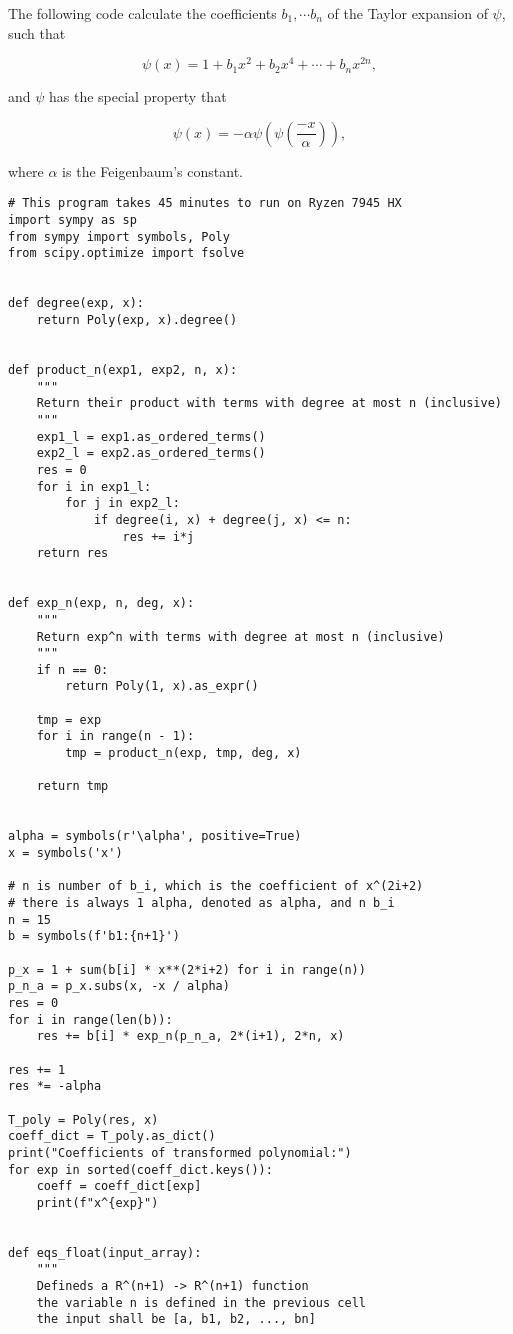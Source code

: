 The following code calculate the coefficients $b_1, \cdots b_n$ of the Taylor expansion of $\psi$, such that

$$
\psi(x) = 1 + b_1 x^2 + b_2 x^4 + \cdots + b_n x^{2n},
$$

and $\psi$ has the special property that 

$$
\psi(x) = - \alpha \psi(\psi(\frac{-x}{\alpha})),
$$

where $\alpha$ is the Feigenbaum's constant.

\begin{lstlisting}[style=python]
# This program takes 45 minutes to run on Ryzen 7945 HX
import sympy as sp
from sympy import symbols, Poly
from scipy.optimize import fsolve


def degree(exp, x):
    return Poly(exp, x).degree()


def product_n(exp1, exp2, n, x):
    """
    Return their product with terms with degree at most n (inclusive)
    """
    exp1_l = exp1.as_ordered_terms()
    exp2_l = exp2.as_ordered_terms()
    res = 0
    for i in exp1_l:
        for j in exp2_l:
            if degree(i, x) + degree(j, x) <= n:
                res += i*j
    return res


def exp_n(exp, n, deg, x):
    """
    Return exp^n with terms with degree at most n (inclusive)
    """
    if n == 0:
        return Poly(1, x).as_expr()

    tmp = exp
    for i in range(n - 1):
        tmp = product_n(exp, tmp, deg, x)

    return tmp


alpha = symbols(r'\alpha', positive=True)
x = symbols('x')

# n is number of b_i, which is the coefficient of x^(2i+2)
# there is always 1 alpha, denoted as alpha, and n b_i
n = 15
b = symbols(f'b1:{n+1}')

p_x = 1 + sum(b[i] * x**(2*i+2) for i in range(n))
p_n_a = p_x.subs(x, -x / alpha)
res = 0
for i in range(len(b)):
    res += b[i] * exp_n(p_n_a, 2*(i+1), 2*n, x)

res += 1
res *= -alpha

T_poly = Poly(res, x)
coeff_dict = T_poly.as_dict()
print("Coefficients of transformed polynomial:")
for exp in sorted(coeff_dict.keys()):
    coeff = coeff_dict[exp]
    print(f"x^{exp}")


def eqs_float(input_array):
    """
    Defineds a R^(n+1) -> R^(n+1) function
    the variable n is defined in the previous cell
    the input shall be [a, b1, b2, ..., bn]


\end{lstlisting}
